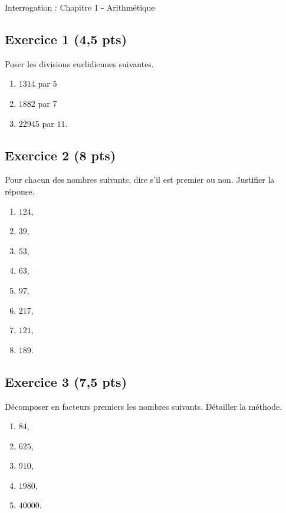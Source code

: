 \documentclass[14 pt]{extarticle}
\theoremstyle{plain}
\begin{document}
\begin{center}{\Large Interrogation : Chapitre 1 - Arithmétique}\\ 
 \end{center}


\subsection*{Exercice 1 (4,5 pts)}
 Poser les divisions euclidiennes suivantes. 
 
 
 \begin{enumerate}
 \item $1314$ par $5$
 \item $1882$ par $7$ 
 \item $22 945$ par $11$. 
 \end{enumerate}

 \subsection*{Exercice 2 (8 pts)}
 
 Pour chacun des nombres suivants, dire s'il est premier ou non. Justifier la réponse. 
\begin{enumerate}
\item $124$,
\item $39$,
\item $53$,
\item $63$,
\item $97$,
\item $217$, 
\item $121$, 
\item $189$.
\end{enumerate}

\subsection*{Exercice 3 (7,5 pts)}
Décomposer en facteurs premiers les nombres suivants. Détailler la méthode.

\begin{enumerate}
\item $84$,
\item $625$, 
\item $910$,
\item $1980$,
\item $40000$.
\end{enumerate}




 	
\end{document}
